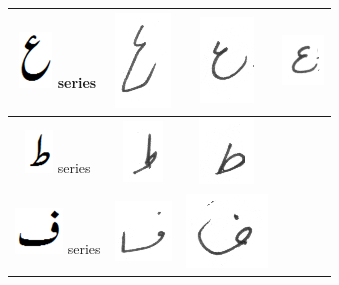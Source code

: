 \documentclass[a4paper,conference]{IEEEtran}
\begin{document}
\begin{table}[h]
\begin{tabular}{@{}cccc@{}}
\hline
\includegraphics[scale=0.15]{aien_orig} series & 
\includegraphics[scale=0.15]{195} & \includegraphics[scale=0.15]{196} &
\includegraphics[scale=0.15]{197}  \\
\hline
\includegraphics[scale=0.15]{tuay_orig} series & \includegraphics[scale=0.15]{198} & 
\includegraphics[scale=0.20]{199} &  \\
\hline
\includegraphics[scale=0.25]{fay_orig} series & \includegraphics[scale=0.25]{200} & \includegraphics[scale=0.20]{201} &  \\

\end{tabular}
\end{table}
\end{document}
